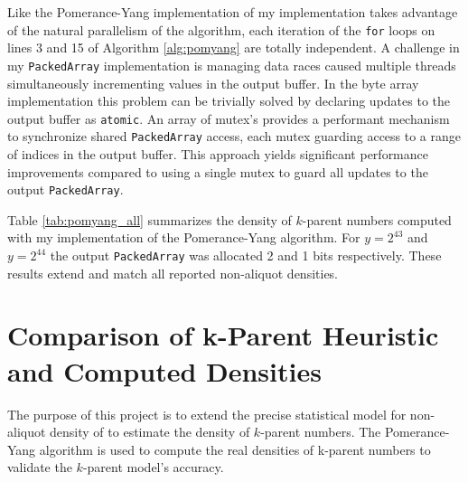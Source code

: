 \documentclass{article}
\theoremstyle{definition}
\begin{document}
Like the Pomerance-Yang implementation of \cite{chum_guy_jacobson_mosunov_2018} my implementation takes advantage of the natural parallelism of the algorithm, each iteration of the \texttt{for} loops on lines 3 and 15 of Algorithm \ref{alg:pomyang} are totally independent. A challenge in my \texttt{PackedArray} implementation is managing data races caused multiple threads simultaneously incrementing values in the output buffer. In the byte array implementation this problem can be trivially solved by declaring updates to the output buffer as \texttt{atomic}. An array of mutex's provides a performant mechanism to synchronize shared \texttt{PackedArray} access, each mutex guarding access to a range of indices in the output buffer. This approach yields significant performance improvements compared to using a single mutex to guard all updates to the output \texttt{PackedArray}.

Table \ref{tab:pomyang_all} summarizes the density of $k$-parent numbers computed with my implementation of the Pomerance-Yang algorithm. For $y  = 2^{43}$ and $y = 2^{44}$ the output \texttt{PackedArray} was allocated 2 and 1 bits respectively. These results extend \cite{chum_guy_jacobson_mosunov_2018} and match all reported non-aliquot densities. 

\section{Comparison of k-Parent Heuristic and Computed Densities}
The purpose of this project is to extend the precise statistical model for non-aliquot density of \cite{pollPom} to estimate the density of $k$-parent numbers. The Pomerance-Yang algorithm is used to compute the real densities of k-parent numbers to validate the $k$-parent model's accuracy.  



\pagebreak
\appendix
\end{document}
